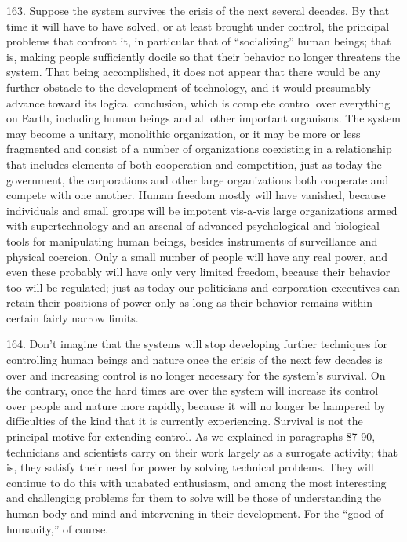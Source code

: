 \documentclass{article}
\begin{document}
163.  Suppose the system survives the crisis of the next several decades.  By that time it will have 
to  have  solved,  or  at  least  brought  under  control,  the  principal  problems  that  confront  it,  in  
particular  that  of  “socializing”  human  beings;  that  is,  making  people  sufficiently  docile  so  that  
their behavior no longer threatens the system.  That being accomplished, it does not appear that 
there would be any further obstacle to the development of technology, and it would presumably 
advance  toward  its  logical  conclusion,  which  is  complete  control  over  everything  on  Earth,  
including human beings  and all other important organisms.  The system may  become a unitary, 
monolithic  organization,  or  it  may  be  more  or  less  fragmented  and  consist  of  a  number  of  
organizations coexisting in a relationship that includes elements of both cooperation and 
competition,  just  as  today  the  government,  the  corporations  and  other  large  organizations  both  
cooperate  and  compete  with  one  another.   Human  freedom  mostly  will  have  vanished,  because  
individuals and small groups will be impotent vis-a-vis large organizations armed with 
supertechnology and an arsenal of advanced psychological and biological tools for manipulating 
human beings, besides instruments of surveillance and physical coercion.  Only a small number of 
people will have any  real power,  and even these  probably  will have only  very limited freedom, 
because  their  behavior  too  will  be  regulated;  just  as  today  our  politicians  and  corporation  
executives can retain their positions of power only as long as their behavior remains within certain 
fairly narrow limits. \vspace{\baselineskip}

164.  Don’t imagine that the systems will stop developing further techniques for controlling human 
beings and nature once the crisis of the next few decades is over and increasing control is no longer 
necessary for the system’s survival.  On the contrary, once the hard times are over the system will 
increase its control over people and nature more rapidly, because it will no longer be hampered by 
difficulties of the kind that it is currently experiencing.  Survival is not the principal motive for 
extending control.  As we explained in paragraphs 87-90, technicians and scientists carry on their 
work largely as a surrogate activity; that is, they satisfy their need for power by solving technical 
problems.  They will continue to do this with unabated enthusiasm, and among the most interesting 
and challenging problems for them to solve will be those of understanding the human body and 
mind and intervening in their development.  For the “good of humanity,” of course. \vspace{\baselineskip}
\end{document}
